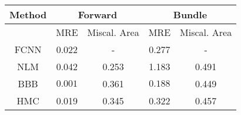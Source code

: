 \documentclass[convert={outext=.png}]{standalone}
\begin{document}
\centering
\label{tab:experimental_results}



\begin{tabular}{c c c c c}
\hline
\hline
Method &  \multicolumn{2}{c}{Forward} & \multicolumn{2}{c}{Bundle} \\ \hline
 & MRE & Miscal. Area & MRE & Miscal. Area\\
 FCNN & 0.022 & - & 0.277 & - \\
 \hline
 NLM & 0.042 & 0.253 & 1.183 & 0.491 \\
 BBB & $\mathbf{0.001}$ & 0.361 & $\mathbf{0.188}$ & 0.449 \\
 HMC & 0.019 & 0.345 & 0.322 & 0.457 \\
\hline
\hline
\end{tabular}
\end{document}

